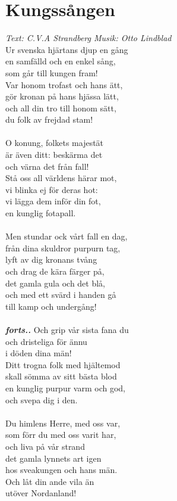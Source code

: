 \section{Kungssången}
\textit{Text: C.V.A Strandberg \hspace{5mm} Musik: Otto Lindblad}
\vspace{2mm}\\
Ur svenska hjärtans djup en gång \\
en samfälld och en enkel sång,\\
som går till kungen fram!\\
Var honom trofast och hans ätt,\\
gör kronan på hans hjässa lätt,\\
och all din tro till honom sätt,\\
du folk av frejdad stam!\\
\\
O konung, folkets majestät\\
är även ditt: beskärma det\\
och värna det från fall!\\
Stå oss all världens härar mot,\\
vi blinka ej för deras hot:\\
vi lägga dem inför din fot,\\
en kunglig fotapall.\\
\\
Men stundar ock vårt fall en dag,\\
från dina skuldror purpurn tag,\\
lyft av dig kronans tvång\\
och drag de kära färger på,\\
det gamla gula och det blå,\\
och med ett svärd i handen gå\\
till kamp och undergång!\\
\\
\textbf{\textit{forts..}}
\newpage
\noindent Och grip vår sista fana du\\
och dristeliga för ännu\\
i döden dina män!\\
Ditt trogna folk med hjältemod\\
skall sömma av sitt bästa blod\\
en kunglig purpur varm och god,\\
och svepa dig i den.\\
\\
Du himlens Herre, med oss var,\\
som förr du med oss varit har,\\
och liva på vår strand\\
det gamla lynnets art igen\\
hos sveakungen och hans män.\\
Och låt din ande vila än\\
utöver Nordanland!
\newpage
